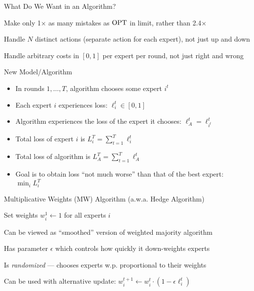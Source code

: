 \documentclass[11pt,aspectratio=169]{beamer}
\begin{document}
  
  \begin{frame}{What Do We Want in an Algorithm?}
   \begin{itemizes}[1.5em]
    \item Make only 1$\times$ as many mistakes as ${\rm OPT}$ in limit, rather than 2.4$\times$
    \item Handle $N$ distinct actions (separate action for each expert), not just up and down
    \item Handle arbitrary costs in $[0,1]$ per expert per round, not just right and wrong
   \end{itemizes}
  \end{frame}
  
  
  \begin{frame}{New Model/Algorithm}
   \begin{itemize}[<+->]
   \setlength{\itemsep}{1em}
    \item In rounds $1,\ldots, T$, algorithm \alert{chooses some expert} $i^t$
    \item Each expert $i$ \alert{experiences loss}: $\ell_i^t \in [0,1]$
    \item Algorithm experiences the loss of the expert it chooses: $\ell_A^t = \ell_{i^t}^t$
    \item Total loss of expert $i$ is $L_i^T = \sum_{t=1}^T \ell_i^t$
    \item Total loss of algorithm is $L_A^T = \sum_{t=1}^T \ell_A^t$
    \item Goal is to obtain loss \alert{``not much worse''} than that of the best expert: $\min_i L_i^T$
   \end{itemize}
  \end{frame}
  
  
  \begin{frame}{Multiplicative Weights (MW) Algorithm (a.w.a. Hedge Algorithm)}
   \begin{algorithm*}[H]
    Set weights $w_i^1 \leftarrow 1$ for all experts $i$\;
   \end{algorithm*}
   
   \vspace{1em}
   
   \begin{itemizes}[0.7em]\small
    \item<2-> Can be viewed as ``smoothed'' version of weighted majority algorithm
    \item<3-> Has parameter $\epsilon$ which controls how quickly it down-weights experts
    \item<4-> Is \emph{randomized} --- chooses experts w.p. proportional to their weights
    \item<5-> Can be used with alternative update: $w_i^{t+1} \leftarrow w_i^t \cdot(1-\epsilon \ell_i^t)$
   \end{itemizes}
  \end{frame}
  
\end{document}
